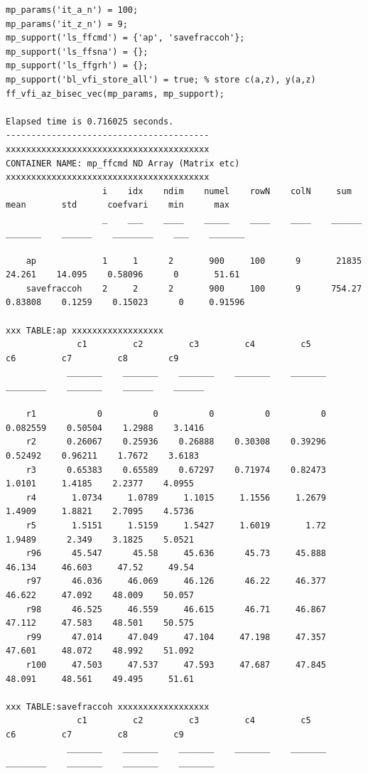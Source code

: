 \documentclass[
]{book}
\begin{document}
\begin{verbatim}
mp_params('it_a_n') = 100;
mp_params('it_z_n') = 9;
mp_support('ls_ffcmd') = {'ap', 'savefraccoh'};
mp_support('ls_ffsna') = {};
mp_support('ls_ffgrh') = {};
mp_support('bl_vfi_store_all') = true; % store c(a,z), y(a,z)
ff_vfi_az_bisec_vec(mp_params, mp_support);

Elapsed time is 0.716025 seconds.
----------------------------------------
xxxxxxxxxxxxxxxxxxxxxxxxxxxxxxxxxxxxxxxx
CONTAINER NAME: mp_ffcmd ND Array (Matrix etc)
xxxxxxxxxxxxxxxxxxxxxxxxxxxxxxxxxxxxxxxx
                   i    idx    ndim    numel    rowN    colN     sum       mean       std      coefvari    min      max  
                   _    ___    ____    _____    ____    ____    ______    _______    ______    ________    ___    _______

    ap             1     1      2       900     100      9       21835     24.261    14.095    0.58096      0       51.61
    savefraccoh    2     2      2       900     100      9      754.27    0.83808    0.1259    0.15023      0     0.91596

xxx TABLE:ap xxxxxxxxxxxxxxxxxx
              c1         c2         c3         c4         c5          c6         c7         c8        c9  
            _______    _______    _______    _______    _______    ________    _______    ______    ______

    r1            0          0          0          0          0    0.082559    0.50504    1.2988    3.1416
    r2      0.26067    0.25936    0.26888    0.30308    0.39296     0.52492    0.96211    1.7672    3.6183
    r3      0.65383    0.65589    0.67297    0.71974    0.82473      1.0101     1.4185    2.2377    4.0955
    r4       1.0734     1.0789     1.1015     1.1556     1.2679      1.4909     1.8821    2.7095    4.5736
    r5       1.5151     1.5159     1.5427     1.6019       1.72      1.9489      2.349    3.1825    5.0521
    r96      45.547      45.58     45.636      45.73     45.888      46.134     46.603     47.52     49.54
    r97      46.036     46.069     46.126      46.22     46.377      46.622     47.092    48.009    50.057
    r98      46.525     46.559     46.615      46.71     46.867      47.112     47.583    48.501    50.575
    r99      47.014     47.049     47.104     47.198     47.357      47.601     48.072    48.992    51.092
    r100     47.503     47.537     47.593     47.687     47.845      48.091     48.561    49.495     51.61

xxx TABLE:savefraccoh xxxxxxxxxxxxxxxxxx
              c1         c2         c3         c4         c5          c6         c7         c8         c9   
            _______    _______    _______    _______    _______    ________    _______    _______    _______


\end{verbatim}
\end{document}
